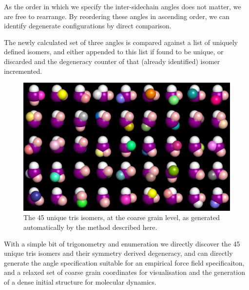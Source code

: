 \documentclass[journal=nanofd,manuscript=suppinfo]{achemso}
\begin{document}
As the order in which we specify the inter-sidechain angles does not matter, we
are free to rearrange.
By reordering these angles in ascending order, we can identify degenerate
configurations by direct comparison.

The newly calculated set of three angles is compared against a list of uniquely
defined isomers, and either appended to this list if found to be unique, or
discarded and the degeneracy counter of that (already identified) isomer incremented.

\begin{figure}[ht!]
    \begin{center}
        \includegraphics[width=\textwidth]{tris_45_isomers.png}
            \caption{\label{fig-trisCG}The 45 unique tris isomers, at the coarse grain level, as generated automatically by the method described here.}
    \end{center}
\end{figure}



With a simple bit of trigonometry and enumeration we directly discover the 45
unique tris isomers and their symmetry derived degeneracy, and can directly
generate the angle specification suitable for an empirical force field
specificaiton, and a relaxed set of coarse grain coordinates for visualisation
and the generation of a dense initial structure for molecular dynamics.
\end{document}

